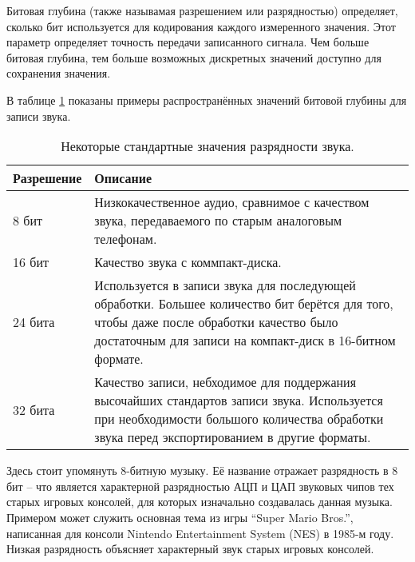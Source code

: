 \documentclass[../sparc.tex]{subfiles}
\begin{document}
Битовая глубина (также называмая разрешением или разрядностью) определяет,
сколько бит используется для кодирования каждого измеренного значения.  Этот
параметр определяет точность передачи записанного сигнала.  Чем больше битовая
глубина, тем больше возможных дискретных значений доступно для сохранения
значения.  \cite{audacityteam:bit-depth}

В таблице \ref{table:adc-sound-bit-depth-1} показаны примеры распространённых
значений битовой глубины для записи звука.

\begin{table}[h]
  \centering
  \begin{tabular}{p{2cm}|p{9cm}}
    Разрешение & Описание \\
    \hline \hline

    8 бит & Низкокачественное аудио, сравнимое с качеством звука, передаваемого
    по старым аналоговым телефонам. \\

    \hline

    16 бит & Качество звука с коммпакт-диска. \\

    \hline

    24 бита & Используется в записи звука для последующей обработки.  Большее
    количество бит берётся для того, чтобы даже после обработки качество было
    достаточным для записи на компакт-диск в 16-битном формате. \\

    \hline

    32 бита & Качество записи, небходимое для поддержания высочайших стандартов
    записи звука.  Используется при необходимости большого количества обработки
    звука перед экспортированием в другие форматы. \\

    \hline

  \end{tabular}
  \caption{Некоторые стандартные значения разрядности звука.}
  \label{table:adc-sound-bit-depth-1}
\end{table}

Здесь стоит упомянуть 8-битную музыку.  Её название отражает разрядность в 8 бит
-- что является характерной разрядностью \gls{АЦП} и \gls{ЦАП} звуковых чипов тех
старых игровых консолей, для которых изначально создавалась данная музыка.
Примером может служить основная тема из игры ``Super Mario Bros.'', написанная
для консоли Nintendo Entertainment System (NES) в 1985-м году.  Низкая
разрядность объясняет характерный звук старых игровых консолей.
\end{document}
